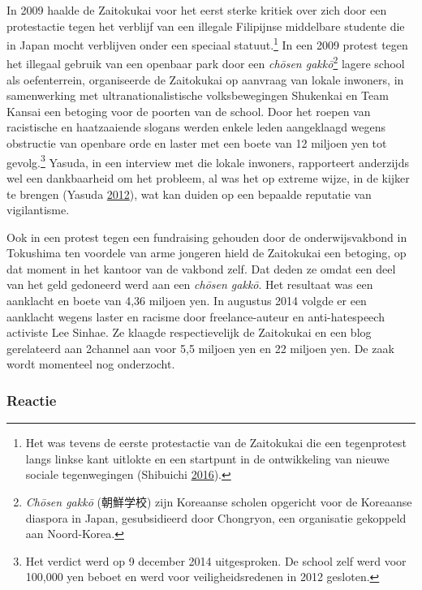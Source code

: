 \documentclass[10.5pt,dutch,]{article}
\begin{document}
In 2009 haalde de Zaitokukai voor het eerst sterke kritiek over zich
door een protestactie tegen het verblijf van een illegale Filipijnse
middelbare studente die in Japan mocht verblijven onder een speciaal
statuut.\footnote{Het was tevens de eerste protestactie van de
  Zaitokukai die een tegenprotest langs linkse kant uitlokte en een
  startpunt in de ontwikkeling van nieuwe sociale tegenwegingen
  (Shibuichi
  \protect\hyperlink{ref-shibuichiux5fstruggleux5f2016}{2016}).} In een
2009 protest tegen het illegaal gebruik van een openbaar park door een
\emph{chōsen gakkō}\footnote{\emph{Chōsen gakkō} (朝鮮学校) zijn
  Koreaanse scholen opgericht voor de Koreaanse diaspora in Japan,
  gesubsidieerd door Chongryon, een organisatie gekoppeld aan
  Noord-Korea.} lagere school als oefenterrein, organiseerde de
Zaitokukai op aanvraag van lokale inwoners, in samenwerking met
ultranationalistische volksbewegingen Shukenkai en Team Kansai een
betoging voor de poorten van de school. Door het roepen van racistische
en haatzaaiende slogans werden enkele leden aangeklaagd wegens
obstructie van openbare orde en laster met een boete van 12 miljoen yen
tot gevolg.\footnote{Het verdict werd op 9 december 2014 uitgesproken.
  De school zelf werd voor 100,000 yen beboet en werd voor
  veiligheidsredenen in 2012 gesloten.} Yasuda, in een interview met die
lokale inwoners, rapporteert anderzijds wel een dankbaarheid om het
probleem, al was het op extreme wijze, in de kijker te brengen (Yasuda
\protect\hyperlink{ref-yasudaux5fnettoux5f2012}{2012}), wat kan duiden
op een bepaalde reputatie van vigilantisme.

Ook in een protest tegen een fundraising gehouden door de
onderwijsvakbond in Tokushima ten voordele van arme jongeren hield de
Zaitokukai een betoging, op dat moment in het kantoor van de vakbond
zelf. Dat deden ze omdat een deel van het geld gedoneerd werd aan een
\emph{chōsen gakkō}. Het resultaat was een aanklacht en boete van 4,36
miljoen yen. In augustus 2014 volgde er een aanklacht wegens laster en
racisme door freelance-auteur en anti-hatespeech activiste Lee Sinhae.
Ze klaagde respectievelijk de Zaitokukai en een blog gerelateerd aan
2channel aan voor 5,5 miljoen yen en 22 miljoen yen. De zaak wordt
momenteel nog onderzocht.

\subsubsection{Reactie}\label{reactie}
\end{document}
